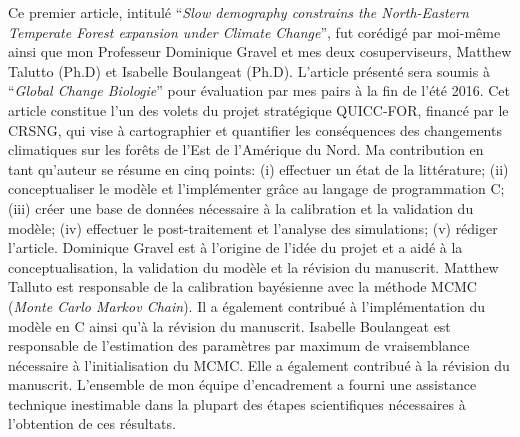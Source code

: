 Ce premier article, intitulé \enquote{\textit{Slow demography constrains the North-Eastern Temperate
Forest expansion under Climate Change}}, fut corédigé par moi-même ainsi que mon Professeur
Dominique Gravel et mes deux cosuperviseurs, Matthew Talutto (Ph.D) et Isabelle Boulangeat (Ph.D).
L'article présenté sera soumis à \enquote{\textit{Global Change Biologie}} pour évaluation par mes
pairs à la fin de l'été 2016. Cet article constitue l'un des volets du projet stratégique QUICC-FOR,
financé par le CRSNG, qui vise à cartographier et quantifier les conséquences des changements
climatiques sur les forêts de l'Est de l'Amérique du Nord. Ma contribution en tant qu'auteur se
résume en cinq points: (i) effectuer un état de la littérature; (ii) conceptualiser le modèle et
l’implémenter grâce au langage de programmation C; (iii) créer une base de données nécessaire à la
calibration et la validation du modèle; (iv) effectuer le post-traitement et l'analyse des
simulations; (v) rédiger l'article. Dominique Gravel est à l'origine de l'idée du projet et a aidé à
la conceptualisation, la validation du modèle et la révision du manuscrit. Matthew Talluto est
responsable de la calibration bayésienne avec la méthode MCMC (\textit{Monte Carlo Markov Chain}).
Il a également contribué à l'implémentation du modèle en C ainsi qu'à la révision du manuscrit.
Isabelle Boulangeat est responsable de l'estimation des paramètres par maximum de vraisemblance
nécessaire à l'initialisation du MCMC. Elle a également contribué à la révision du manuscrit.
L'ensemble de mon équipe d'encadrement a fourni une assistance technique inestimable dans la plupart
des étapes scientifiques nécessaires à l'obtention de ces résultats.

